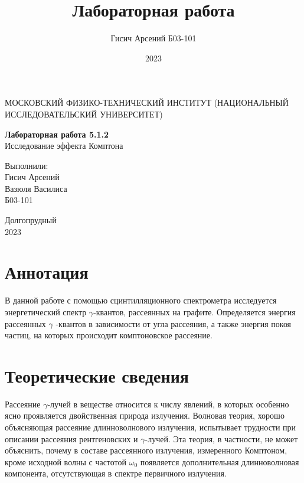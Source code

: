 \documentclass[a4paper, 12pt]{article}
\title{Лабораторная работа}
\author{Гисич Арсений Б03-101}
\date{2023}
\begin{document}
	\begin{center}
		{\large МОСКОВСКИЙ ФИЗИКО-ТЕХНИЧЕСКИЙ ИНСТИТУТ (НАЦИОНАЛЬНЫЙ ИССЛЕДОВАТЕЛЬСКИЙ УНИВЕРСИТЕТ)}
	\end{center}
	\vspace{5 cm}
	{\Large
		\begin{center}
			{\bf Лабораторная работа 5.1.2}\\[0.2 cm]
			Исследование эффекта Комптона
		\end{center}
	}
	\vspace{4 cm}
	\begin{flushright}
		{\Large Выполнили: \\
			\vspace{0.2 cm}
			Гисич Арсений \\
            Вазюля Василиса \\ 
			\vspace{0.2 cm}
			Б03-101 \\}
	\end{flushright}
	\vspace{8 cm}
	\begin{center}
		Долгопрудный\\[0.1 cm]
		2023
	\end{center}
\thispagestyle{empty}

\section{Аннотация}

В данной работе с помощью сцинтилляционного спектрометра исследуется энергетический спектр $\gamma$-квантов, рассеянных на графите. Определяется энергия рассеянных $\gamma$ -квантов в зависимости от угла рассеяния, а также энергия покоя частиц, на которых происходит комптоновское рассеяние.

\section{Теоретические сведения}

Рассеяние $\gamma$-лучей в веществе относится к числу явлений, в которых особенно ясно проявляется двойственная природа излучения. Волновая теория, хорошо объясняющая рассеяние длинноволнового излучения, испытывает трудности при описании рассеяния рентгеновских и $\gamma$-лучей. Эта теория, в частности, не может объяснить, почему в составе рассеянного излучения, измеренного Комптоном, кроме исходной волны с частотой $\omega_{0}$ появляется дополнительная длинноволновая компонента, отсутствующая в спектре первичного излучения.
\end{document}
